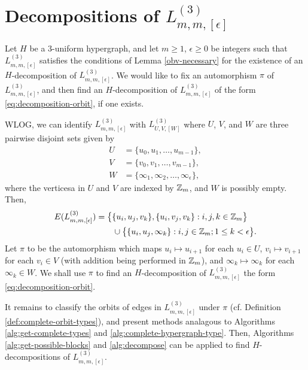 \section{Decompositions of $L_{m,m,[\epsilon]}^{(3)}$}
\label{sec:methods/candelabra}

Let $H$ be a $3$-uniform hypergraph, and let $m \geq 1$, $\epsilon \geq 0$ be integers such that $L_{m,m,[\epsilon]}^{(3)}$ satisfies the conditions of Lemma \ref{obv-necessary} for the existence of an $H$-decomposition of $L_{m,m,[\epsilon]}^{(3)}$.
We would like to fix an automorphism $\pi$ of $L_{m,m,[\epsilon]}^{(3)}$, and then find an $H$-decomposition of $L_{m,m,[\epsilon]}^{(3)}$ of the form \eqref{eq:decomposition-orbit}, if one exists.

WLOG, we can identify $L_{m,m,[\epsilon]}^{(3)}$ with $L_{U,V,[W]}^{(3)}$ where
$U$, $V$, and $W$ are three pairwise disjoint sets given by
\begin{align}
    U &= \{ u_0, u_1, \ldots, u_{m-1} \}, \nonumber \\
    V &= \{ v_0, v_1, \ldots, v_{m-1} \}, \nonumber \\
    W &= \{ \infty_1, \infty_2, \ldots, \infty_\epsilon \}, \nonumber
\end{align}
where the verticesa in $U$ and $V$ are indexed by $\mathbb{Z}_m$, and $W$ is possibly empty. Then,
\begin{align}
    \label{eq:candelabra-edges}
    E(L_{m,m,[\epsilon]}^{(3)})
    &= \big\{ \{u_i, u_j, v_k\}, \{u_i, v_j, v_k\} : i,j,k \in \mathbb{Z}_m \big\} \\
    & \quad \quad
    \cup \big\{ \{u_i, u_j, \infty_k\} : i,j \in \mathbb{Z}_m; 1 \leq k < \epsilon \big\}.
    \nonumber 
\end{align}
Let $\pi$ to be the automorphism which maps $u_i \mapsto u_{i+1}$ for each $u_i \in U$,
$v_i \mapsto v_{i+1}$ for each $v_i \in V$ (with addition being performed in $\mathbb{Z}_m$), and
$\infty_k \mapsto \infty_k$ for each $\infty_k \in W$.
We shall use $\pi$ to find an $H$-decomposition of $L_{m,m,[\epsilon]}^{(3)}$ the form \eqref{eq:decomposition-orbit}.

It remains to classify the orbits of edges in $L_{m,m,[\epsilon]}^{(3)}$ under $\pi$ (cf. Definition \ref{def:complete-orbit-types}), and present methods analagous to Algorithms \ref{alg:get-complete-types} and \ref{alg:complete-hypergraph-type}.
Then, Algorithms \ref{alg:get-possible-blocks} and \ref{alg:decompose} can be applied to find $H$-decompositions of $L_{m,m,[\epsilon]}^{(3)}$.

